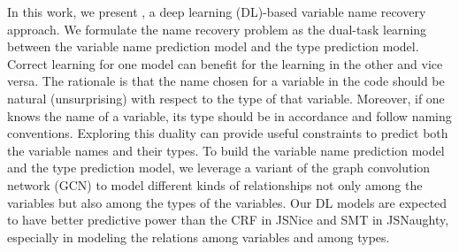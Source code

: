 


In this work, we present {\tool}, a deep learning (DL)-based variable
name recovery approach. We formulate the name recovery problem as the
dual-task learning between the variable name prediction model and the
type prediction model. Correct learning for one model can benefit for
the learning in the other and vice versa. The rationale is that the
name chosen for a variable in the code should be natural
(unsurprising) with respect to the type of that variable. Moreover, if
one knows the name of a variable, its type should be in accordance and
follow naming conventions. Exploring this duality can provide useful
constraints to predict both the variable names and their types.  To
build the variable name prediction model and the type prediction
model, we leverage a variant of the graph convolution network (GCN) to
model different kinds of relationships not only among the variables
but also among the types of the variables. Our DL models are
expected to have better predictive power than the CRF in JSNice and
SMT in JSNaughty, especially in modeling the relations among variables
and among types.
